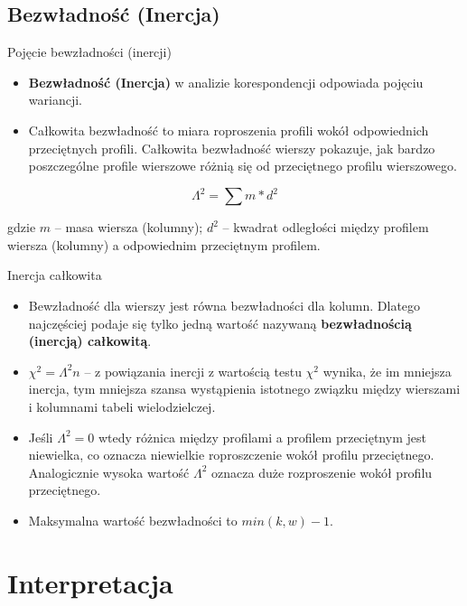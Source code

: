\documentclass{beamer}
\begin{document}
\subsection{Bezwładność (Inercja)}
\begin{frame}{Pojęcie bewzładności (inercji)}
  \begin{itemize}
  \item \textbf{Bezwładność (Inercja)} w analizie korespondencji odpowiada pojęciu wariancji.
  \item Całkowita bezwładność to miara roproszenia profili wokół odpowiednich przeciętnych profili. Całkowita bezwładność wierszy pokazuje, jak bardzo poszczególne profile wierszowe różnią się od przeciętnego profilu wierszowego.
  \end{itemize}
  $$\Lambda^2 = \sum m* d^2$$
  \begin{scriptsize}
    gdzie $m$ -- masa wiersza (kolumny); $d^2$ -- kwadrat odległości między profilem wiersza (kolumny) a odpowiednim przeciętnym profilem. 
  \end{scriptsize}
\end{frame}

\begin{frame}{Inercja całkowita}
  \begin{itemize}
  \item Bewzładność dla wierszy jest równa bezwładności dla kolumn. Dlatego najczęściej podaje się tylko jedną wartość nazywaną \textbf{bezwładnością (inercją) całkowitą}.
  \item $\chi^2 = \Lambda^2n$ -- z powiązania inercji z wartością testu $\chi^2$ wynika, że im mniejsza inercja, tym mniejsza szansa wystąpienia istotnego związku między wierszami i kolumnami tabeli wielodzielczej.
  \item Jeśli $\Lambda^2 = 0$ wtedy różnica między profilami a profilem przeciętnym jest niewielka, co oznacza niewielkie roproszczenie wokół profilu przeciętnego. Analogicznie wysoka wartość $\Lambda^2$ oznacza duże rozproszenie wokół profilu przeciętnego.
  \item Maksymalna wartość bezwładności to $min(k, w)-1$.
  \end{itemize}
\end{frame}

\section{Interpretacja}
\end{document}
